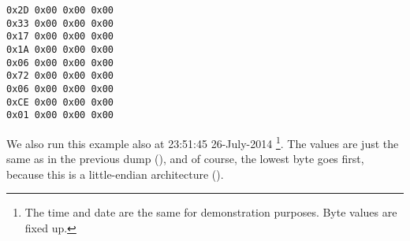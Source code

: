 

\begin{lstlisting}
0x2D 0x00 0x00 0x00 
0x33 0x00 0x00 0x00 
0x17 0x00 0x00 0x00 
0x1A 0x00 0x00 0x00 
0x06 0x00 0x00 0x00 
0x72 0x00 0x00 0x00 
0x06 0x00 0x00 0x00 
0xCE 0x00 0x00 0x00 
0x01 0x00 0x00 0x00 
\end{lstlisting}

We also run this example also at 23:51:45 26-July-2014
\footnote{The time and date are the same for demonstration purposes. Byte values are fixed up.}.
The values are just the same as in the previous dump 
(), and of course, the lowest byte goes first, because this is a little-endian architecture 
().


